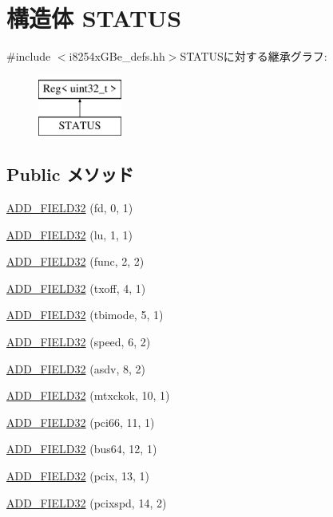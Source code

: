 \hypertarget{structiGbReg_1_1Regs_1_1STATUS}{
\section{構造体 STATUS}
\label{structiGbReg_1_1Regs_1_1STATUS}
}


{\ttfamily \#include $<$i8254xGBe\_\-defs.hh$>$}STATUSに対する継承グラフ:\begin{figure}[H]
\begin{center}
\leavevmode
\includegraphics[height=2cm]{structiGbReg_1_1Regs_1_1STATUS}
\end{center}
\end{figure}
\subsection*{Public メソッド}
\begin{DoxyCompactItemize}
\item 
\hyperlink{structiGbReg_1_1Regs_1_1STATUS_a03e5dea6349337c8756f6003f2d02adc}{ADD\_\-FIELD32} (fd, 0, 1)
\item 
\hyperlink{structiGbReg_1_1Regs_1_1STATUS_a9a39b40a3a69f12dda2a41653a9400d0}{ADD\_\-FIELD32} (lu, 1, 1)
\item 
\hyperlink{structiGbReg_1_1Regs_1_1STATUS_a920acf16d3f79a3905d1391bb2e212f1}{ADD\_\-FIELD32} (func, 2, 2)
\item 
\hyperlink{structiGbReg_1_1Regs_1_1STATUS_a70de0322bbd7214bdb02689186445967}{ADD\_\-FIELD32} (txoff, 4, 1)
\item 
\hyperlink{structiGbReg_1_1Regs_1_1STATUS_af07613b94422786f8c052e8d31f55b29}{ADD\_\-FIELD32} (tbimode, 5, 1)
\item 
\hyperlink{structiGbReg_1_1Regs_1_1STATUS_a6b04e14e37ce01e3491a13f0639ba229}{ADD\_\-FIELD32} (speed, 6, 2)
\item 
\hyperlink{structiGbReg_1_1Regs_1_1STATUS_ab15c483aaf0188314407992ab65628b7}{ADD\_\-FIELD32} (asdv, 8, 2)
\item 
\hyperlink{structiGbReg_1_1Regs_1_1STATUS_a7e9d05f77b70b21b1f24808ca172c2be}{ADD\_\-FIELD32} (mtxckok, 10, 1)
\item 
\hyperlink{structiGbReg_1_1Regs_1_1STATUS_a892ecd6774d691cef7c02b8c5d8aaf13}{ADD\_\-FIELD32} (pci66, 11, 1)
\item 
\hyperlink{structiGbReg_1_1Regs_1_1STATUS_a93e5416e92734a137f7b29aea39e754f}{ADD\_\-FIELD32} (bus64, 12, 1)
\item 
\hyperlink{structiGbReg_1_1Regs_1_1STATUS_a1280bb46f4cc1dedd54d35540b2819a0}{ADD\_\-FIELD32} (pcix, 13, 1)
\item 
\hyperlink{structiGbReg_1_1Regs_1_1STATUS_a3f0b6d87010509ed0e980357a852012f}{ADD\_\-FIELD32} (pcixspd, 14, 2)
\end{DoxyCompactItemize}


